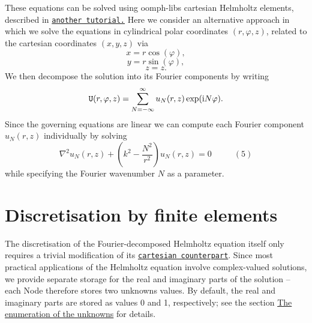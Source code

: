 These equations can be solved using {\ttfamily oomph-\/lib\textquotesingle{}s} cartesian Helmholtz elements, described in \href{../../../helmholtz/scattering/html/index.html}{\tt another tutorial.} Here we consider an alternative approach in which we solve the equations in cylindrical polar coordinates $ (r,\varphi,z) $, related to the cartesian coordinates $ (x,y,z) $ via \[ x = r \cos(\varphi), \] \[ y = r \sin(\varphi), \] \[ z = z. \] We then decompose the solution into its Fourier components by writing \[ {\tt U}(r,\varphi,z) = \sum_{N=-\infty}^{\infty} u_N(r,z) \exp({\rm i} N \varphi). \] Since the governing equations are linear we can compute each Fourier component $ u_N(r,z) $ individually by solving \[ \nabla^2 {u_{N}}(r,z) + \left(k^2-\frac{N^2}{r^2}\right) u_N(r,z) = 0 \ \ \ \ \ \ \ \ \ \ \ \ (5) \] while specifying the Fourier wavenumber $ N $ as a parameter.



 

\hypertarget{index_discr}{}\section{Discretisation by finite elements}\label{index_discr}
The discretisation of the Fourier-\/decomposed Helmholtz equation itself only requires a trivial modification of its \href{../../../helmholtz/scattering/html/index.html}{\tt cartesian counterpart}. Since most practical applications of the Helmholtz equation involve complex-\/valued solutions, we provide separate storage for the real and imaginary parts of the solution -- each {\ttfamily Node} therefore stores two unknowns values. By default, the real and imaginary parts are stored as values 0 and 1, respectively; see the section \hyperlink{index_numbering}{The enumeration of the unknowns} for details.

